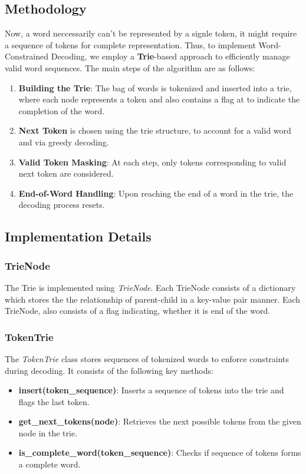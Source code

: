 \documentclass{article}
\begin{document}
\subsection{Methodology}
Now, a word neccessarily can't be represented by a signle token, it might require a sequence of tokens for complete representation. Thus, to implement Word-Constrained Decoding, we employ a \textbf{Trie}-based approach to efficiently manage valid word sequences. The main steps of the algorithm are as follows:

\begin{enumerate}
    \item \textbf{Building the Trie}: The bag of words is tokenized and inserted into a trie, where each node represents a token and also contains a flag at to indicate the completion of the word.
    \item \textbf{Next Token} is chosen using the trie structure, to account for a valid word and via greedy decoding.
    \item \textbf{Valid Token Masking}: At each step, only tokens corresponding to valid next token are considered.
    \item \textbf{End-of-Word Handling}: Upon reaching the end of a word in the trie, the decoding process resets.
\end{enumerate}

\subsection{Implementation Details}
\subsubsection{TrieNode}
The Trie is implemented using \textit{TrieNode}. Each TrieNode consists of a dictionary which stores the the relationship of parent-child in a key-value pair manner. Each TrieNode, also consists of a flag indicating, whether it is end of the word.

\subsubsection{TokenTrie}
The \textit{TokenTrie} class stores sequences of tokenized words to enforce constraints during decoding. It consists of the following key methods:
\begin{itemize}
    \item \textbf{insert(token\_sequence)}: Inserts a sequence of tokens into the trie and flags the last token.
    \item \textbf{get\_next\_tokens(node)}: Retrieves the next possible tokens from the given node in the trie.
    \item \textbf{is\_complete\_word(token\_sequence)}: Checks if sequence of tokens forms a complete word.
\end{itemize}
\end{document}
